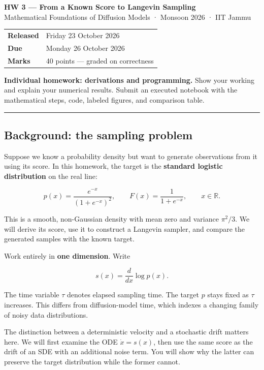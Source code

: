 \documentclass[11pt,a4paper]{article}
\begin{document}
\begin{center}
  {\Large\bfseries HW 3 — From a Known Score to Langevin Sampling}\\[0.4em]
  {\small Mathematical Foundations of Diffusion Models · Monsoon 2026 · IIT Jammu}
\end{center}
\medskip
\begin{center}
\begin{tabular}{@{}ll@{}}
\toprule
\textbf{Released} & Friday 23 October 2026 \\
\textbf{Due} & Monday 26 October 2026 \\
\textbf{Marks} & 40 points --- graded on correctness \\
\bottomrule
\end{tabular}
\end{center}
\medskip
\noindent\textbf{Individual homework: derivations and programming.}
Show your working and explain your numerical results. Submit an executed notebook
with the mathematical steps, code, labeled figures, and comparison table.
\bigskip\hrule\bigskip
\subsection{Background: the sampling
problem}\label{background-the-sampling-problem}

Suppose we know a probability density but want to generate observations
from it using its score. In this homework, the target is the
\textbf{standard logistic distribution} on the real line:

\[
p(x)=\frac{e^{-x}}{(1+e^{-x})^2},\qquad
F(x)=\frac{1}{1+e^{-x}},\qquad x\in\mathbb R.
\]

This is a smooth, non-Gaussian density with mean zero and variance
\(\pi^2/3\). We will derive its score, use it to construct a Langevin
sampler, and compare the generated samples with the known target.

Work entirely in \textbf{one dimension}. Write

\[s(x)=\frac{d}{dx}\log p(x).\]

The time variable \(\tau\) denotes elapsed sampling time. The target
\(p\) stays fixed as \(\tau\) increases. This differs from
diffusion-model time, which indexes a changing family of noisy data
distributions.

The distinction between a deterministic velocity and a stochastic drift
matters here. We will first examine the ODE \(\dot x=s(x)\), then use
the same score as the drift of an SDE with an additional noise term. You
will show why the latter can preserve the target distribution while the
former cannot.
\end{document}
